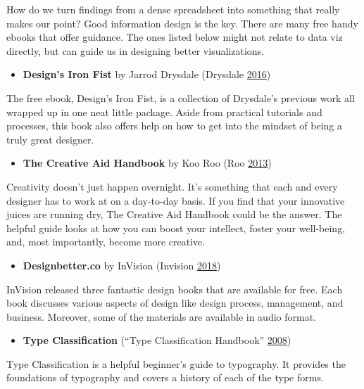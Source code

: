 \documentclass[]{book}
\providecommand{\tightlist}{%
  \setlength{\itemsep}{0pt}\setlength{\parskip}{0pt}}
\begin{document}
How do we turn findings from a dense spreadsheet into something that really makes our point? Good information design is the key. There are many free handy ebooks that offer guidance. The ones listed below might not relate to data viz directly, but can guide us in designing better visualizations.

\begin{itemize}
\tightlist
\item
  \textbf{Design's Iron Fist} by Jarrod Drysdale
  (Drysdale \protect\hyperlink{ref-Design_Iron_Fist}{2016})
\end{itemize}

The free ebook, Design's Iron Fist, is a collection of Drysdale's previous work all wrapped up in one neat little package. Aside from practical tutorials and processes, this book also offers help on how to get into the mindset of being a truly great designer.

\begin{itemize}
\tightlist
\item
  \textbf{The Creative Aid Handbook} by Koo Roo
  (Roo \protect\hyperlink{ref-creative_aid_handbook}{2013})
\end{itemize}

Creativity doesn't just happen overnight. It's something that each and every designer has to work at on a day-to-day basis. If you find that your innovative juices are running dry, The Creative Aid Handbook could be the answer. The helpful guide looks at how you can boost your intellect, foster your well-being, and, most importantly, become more creative.

\begin{itemize}
\tightlist
\item
  \textbf{Designbetter.co} by InVision
  (Invision \protect\hyperlink{ref-invision}{2018})
\end{itemize}

InVision released three fantastic design books that are available for free. Each book discusses various aspects of design like design process, management, and business. Moreover, some of the materials are available in audio format.

\begin{itemize}
\tightlist
\item
  \textbf{Type Classification}
  (``Type Classification Handbook'' \protect\hyperlink{ref-type_class}{2008})
\end{itemize}

Type Classification is a helpful beginner's guide to typography. It provides the foundations of typography and covers a history of each of the type forms.
\end{document}

